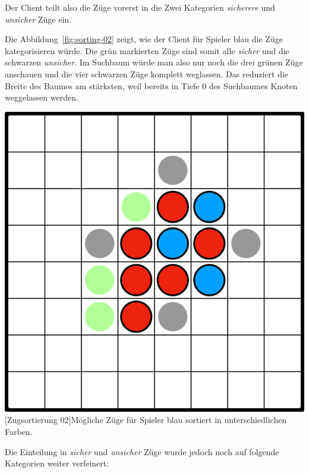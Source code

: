 Der Client teilt also die Z\"uge vorerst in die Zwei Kategorien \textit{sicherere} und \textit{unsicher} Z\"uge ein.

Die Abbildung~\ref{fig:sorting-02} zeigt, wie der Client f\"ur Spieler blau die Z\"uge kategorisieren w\"urde.
Die gr\"un markierten Z\"uge sind somit alle \textit{sicher} und die schwarzen \textit{unsicher}.
Im Suchbaum w\"urde man also nur noch die drei gr\"unen Z\"uge anschauen und die vier schwarzen Z\"uge komplett weglassen.
Das reduziert die Breite des Baumes am st\"arksten, weil bereits in Tiefe $0$ des Suchbaumes Knoten weggelassen werden.

\vspace{1em}
\begin{minipage}{\linewidth}
    \centering
    \includegraphics[width=0.45\linewidth]{pics/sorting-02}
    [Zugsortierung 02]{M\"ogliche Z\"uge f\"ur Spieler blau sortiert in unterschiedlichen Farben.}
    \label{fig:sorting-02}
\end{minipage}
Die Einteilung in \textit{sicher} und \textit{unsicher} Z\"uge wurde jedoch noch auf folgende Kategorien weiter verfeinert:
